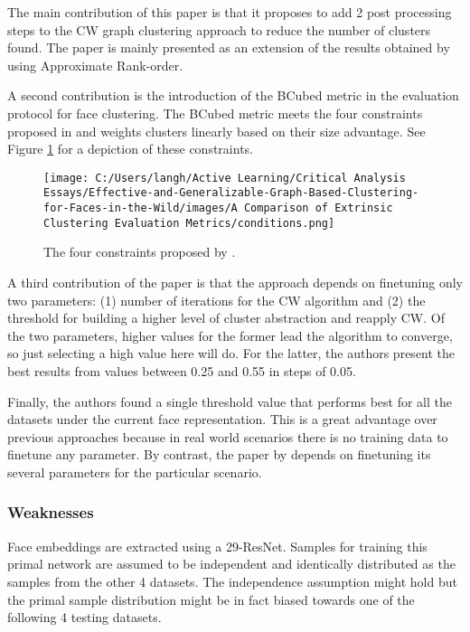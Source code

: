 \documentclass[17pt,]{extarticle}
\begin{document}
The main contribution of this paper is that it proposes to add 2 post processing steps to the CW graph clustering approach to reduce the number of clusters found. The paper is mainly presented as an extension of the results obtained by \autocite{otto2018} using Approximate Rank-order.

A second contribution is the introduction of the BCubed metric in the evaluation protocol for face clustering. The BCubed metric meets the four constraints proposed in \autocite{amigo2009} and weights clusters linearly based on their size advantage. See Figure \ref{fig:conditions} for a depiction of these constraints.

\begin{figure}
\centering
\texttt{[image: C:/Users/langh/Active Learning/Critical Analysis Essays/Effective-and-Generalizable-Graph-Based-Clustering-for-Faces-in-the-Wild/images/A Comparison of Extrinsic Clustering Evaluation Metrics/conditions.png]}
\caption{The four constraints proposed by \autocite{amigo2009}.\label{fig:conditions}}
\end{figure}

A third contribution of the paper is that the approach depends on finetuning only two parameters: (1) number of iterations for the CW algorithm and (2) the threshold for building a higher level of cluster abstraction and reapply CW. Of the two parameters, higher values for the former lead the algorithm to converge, so just selecting a high value here will do. For the latter, the authors present the best results from values between 0.25 and 0.55 in steps of 0.05.

Finally, the authors found a single threshold value that performs best for all the datasets under the current face representation. This is a great advantage over previous approaches because in real world scenarios there is no training data to finetune any parameter. By contrast, the paper by \autocite{otto2018} depends on finetuning its several parameters for the particular scenario.

\hypertarget{weaknesses}{%
\subsubsection{Weaknesses}\label{weaknesses}}

Face embeddings are extracted using a 29-ResNet. Samples for training this primal network are assumed to be independent and identically distributed as the samples from the other 4 datasets. The independence assumption might hold but the primal sample distribution might be in fact biased towards one of the following 4 testing datasets.
\end{document}
